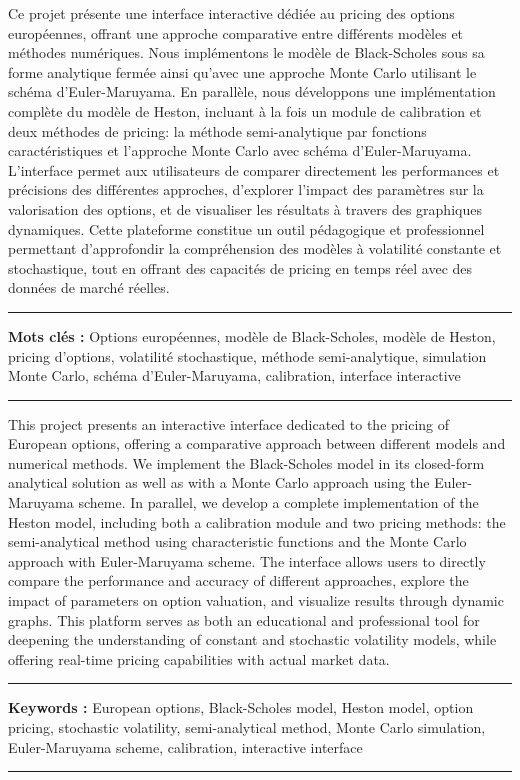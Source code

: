 Ce projet présente une interface interactive dédiée au pricing des options européennes, offrant une approche comparative entre différents modèles et méthodes numériques. Nous implémentons le modèle de Black-Scholes sous sa forme analytique fermée ainsi qu'avec une approche Monte Carlo utilisant le schéma d'Euler-Maruyama. En parallèle, nous développons une implémentation complète du modèle de Heston, incluant à la fois un module de calibration et deux méthodes de pricing: la méthode semi-analytique par fonctions caractéristiques et l'approche Monte Carlo avec schéma d'Euler-Maruyama. L'interface permet aux utilisateurs de comparer directement les performances et précisions des différentes approches, d'explorer l'impact des paramètres sur la valorisation des options, et de visualiser les résultats à travers des graphiques dynamiques. Cette plateforme constitue un outil pédagogique et professionnel permettant d'approfondir la compréhension des modèles à volatilité constante et stochastique, tout en offrant des capacités de pricing en temps réel avec des données de marché réelles.
\vspace{1cm}

\noindent\rule[2pt]{\textwidth}{0.5pt}
{\textbf{Mots clés :}}
Options européennes, modèle de Black-Scholes, modèle de Heston, pricing d'options, volatilité stochastique, méthode semi-analytique, simulation Monte Carlo, schéma d'Euler-Maruyama, calibration, interface interactive
\\
\noindent\rule[2pt]{\textwidth}{0.5pt}
\clearpage

This project presents an interactive interface dedicated to the pricing of European options, offering a comparative approach between different models and numerical methods. We implement the Black-Scholes model in its closed-form analytical solution as well as with a Monte Carlo approach using the Euler-Maruyama scheme. In parallel, we develop a complete implementation of the Heston model, including both a calibration module and two pricing methods: the semi-analytical method using characteristic functions and the Monte Carlo approach with Euler-Maruyama scheme. The interface allows users to directly compare the performance and accuracy of different approaches, explore the impact of parameters on option valuation, and visualize results through dynamic graphs. This platform serves as both an educational and professional tool for deepening the understanding of constant and stochastic volatility models, while offering real-time pricing capabilities with actual market data.
\vspace{1cm}

\noindent\rule[2pt]{\textwidth}{0.5pt}
{\textbf{Keywords :}}
European options, Black-Scholes model, Heston model, option pricing, stochastic volatility, semi-analytical method, Monte Carlo simulation, Euler-Maruyama scheme, calibration, interactive interface
\\
\noindent\rule[2pt]{\textwidth}{0.5pt}
\clearpage
